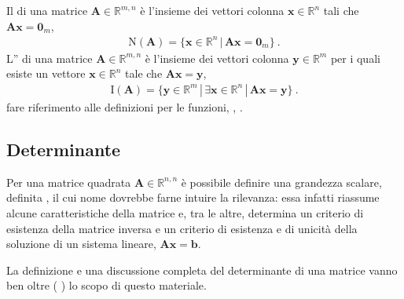 \documentclass[letterpaper,10pt,italian]{jupyterBook}
\begin{document}
\sphinxAtStartPar
Il  di una matrice \(\mathbf{A} \in \mathbb{R}^{m,n}\) è l’insieme dei vettori colonna \(\mathbf{x} \in \mathbb{R}^n\) tali che \(\mathbf{A} \mathbf{x} = \mathbf{0}_m\),
\begin{equation*}
\begin{split}\text{N}(\mathbf{A}) = \{ \mathbf{x} \in \mathbb{R}^n \, | \, \mathbf{A} \mathbf{x} = \mathbf{0}_m \} \ .\end{split}
\end{equation*}
\sphinxAtStartPar
L” di una matrice \(\mathbf{A} \in \mathbb{R}^{m,n}\) è l’insieme dei vettori colonna \(\mathbf{y} \in \mathbb{R}^m\) per i quali esiste un vettore \(\mathbf{x} \in \mathbb{R}^n\) tale che \(\mathbf{A} \mathbf{x} = \mathbf{y}\),
\begin{equation*}
\begin{split}\text{I}(\mathbf{A}) = \{ \mathbf{y} \in \mathbb{R}^m \, | \, \exists \mathbf{x} \in \mathbb{R}^n \, |  \, \mathbf{A} \mathbf{x} = \mathbf{y} \} \ .\end{split}
\end{equation*}
\sphinxAtStartPar
{} fare riferimento alle definizioni per le funzioni, {\hyperref[\detokenize{ch/set:math-hs-fun-range}]{}}, {\hyperref[\detokenize{ch/set:math-hs-fun-null}]{}}.


\subsection{Determinante}
\label{\detokenize{ch/algebra/linear-algebra:determinante}}\label{\detokenize{ch/algebra/linear-algebra:math-hs-algebra-linear-matrices-det}}
\sphinxAtStartPar
Per una matrice quadrata \(\mathbf{A} \in \mathbb{R}^{n,n}\) è possibile definire una grandezza scalare, definita , il cui nome dovrebbe farne intuire la rilevanza: essa infatti riassume alcune caratteristiche della matrice e, tra le altre, determina un criterio di esistenza della matrice inversa e un criterio di esistenza e di unicità della soluzione di un sistema lineare, \(\mathbf{A} \mathbf{x} = \mathbf{b}\).

\sphinxAtStartPar
La definizione e una discussione completa del determinante di una matrice vanno ben oltre ( ) lo scopo di questo materiale.
\end{document}
